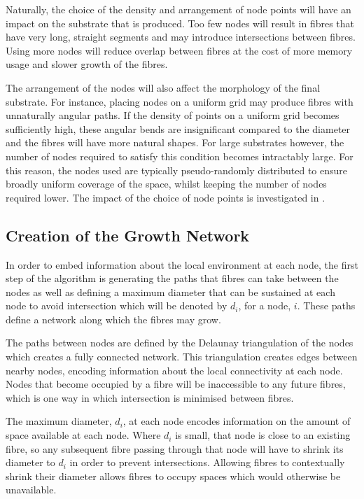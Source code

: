 Naturally, the choice of the density and arrangement of node points will have an impact on the substrate that is produced. Too few nodes will result in fibres that have very long, straight segments and may introduce intersections between fibres. Using more nodes will reduce overlap between fibres at the cost of more memory usage and slower growth of the fibres.

The arrangement of the nodes will also affect the morphology of the final substrate. For instance, placing nodes on a uniform grid may produce fibres with unnaturally angular paths. If the density of points on a uniform grid becomes sufficiently high, these angular bends are insignificant compared to the diameter and the fibres will have more natural shapes. For large substrates however, the number of nodes required to satisfy this condition becomes intractably large. For this reason, the nodes used are typically pseudo-randomly distributed to ensure broadly uniform coverage of the space, whilst keeping the number of nodes required lower. 
The impact of the choice of node points is investigated in .

\subsection{Creation of the Growth Network}
\label{sec:creation_of_the_growth_network}
In order to embed information about the local environment at each node, the first step of the algorithm is generating the paths that fibres can take between the nodes as well as defining a maximum diameter that can be sustained at each node to avoid intersection which will be denoted by $d_i$, for a node, $i$. These paths define a network along which the fibres may grow.

The paths between nodes are defined by the Delaunay triangulation\cite{Delaunay1934} of the nodes which creates a fully connected network.
This triangulation creates edges between nearby nodes, encoding information about the local connectivity at each node.
Nodes that become occupied by a fibre will be inaccessible to any future fibres, which is one way in which intersection is minimised between fibres.  

The maximum diameter, $d_i$, at each node encodes information on the amount of space available at each node.
Where $d_i$ is small, that node is close to an existing fibre, so any subsequent fibre passing through that node will have to shrink its diameter to $d_i$ in order to prevent intersections.
Allowing fibres to contextually shrink their diameter allows fibres to occupy spaces which would otherwise be unavailable.

